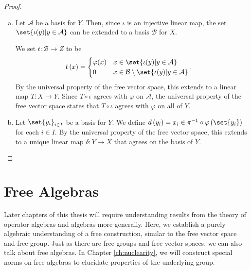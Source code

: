 \begin{proof}\hfill
  \begin{enumerate}[(a)]
    \item Let $\mathcal{A}$ be a basis for $Y$. Then, since $\iota$ is an injective linear map, the set $\set{\iota(y) | y\in \mathcal{A}}$ can be extended to a basis $\mathcal{B}$ for $X$.\newline

      We set $t\colon \mathcal{B}\rightarrow Z$ to be
      \begin{align*}
        t\left(x\right) &= \begin{cases}
          \varphi(x) & x\in \set{\iota(y) | y\in \mathcal{A}}\\
          0 & x\in \mathcal{B}\setminus \set{\iota(y) | y\in \mathcal{A}}
        \end{cases}.
      \end{align*}
      By the universal property of the free vector space, this extends to a linear map $T\colon X\rightarrow Y$. Since $T\circ\iota$ agrees with $\varphi$ on $\mathcal{A}$, the universal property of the free vector space states that $T\circ\iota$ agrees with $\varphi$ on all of $Y$.
    \item Let $\set{y_i}_{i\in I}$ be a basis for $Y$. We define $d\left( y_i \right) = x_i\in  \pi^{-1}\circ \varphi\left( \set{y_i} \right)$ for each $i\in I$.  By the universal property of the free vector space, this extends to a unique linear map $\delta\colon Y\rightarrow X$ that agrees on the basis of $Y$.
  \end{enumerate}
\end{proof}

\section{Free Algebras}%
Later chapters of this thesis will require understanding results from the theory of operator algebras and algebras more generally. Here, we establish a purely algebraic understanding of a free construction, similar to the free vector space and free group. Just as there are free groups and free vector spaces, we can also talk about free algebras. In Chapter \ref{ch:nuclearity}, we will construct special norms on free algebras to elucidate properties of the underlying group.\newline

